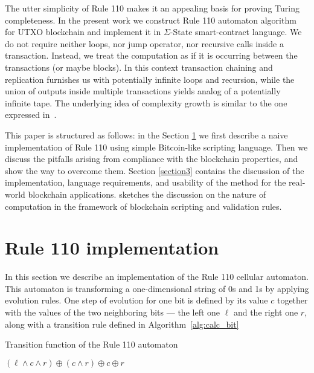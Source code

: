 \documentclass[runningheads]{llncs}
\begin{document}
    The utter simplicity of Rule 110 makes it an appealing basis for proving Turing completeness. 
    In the present work we construct Rule 110 automaton algorithm for UTXO blockchain
    and implement it in $\Sigma$-State smart-contract language\cite{chepurnoy2017sigma}.
    We do not require neither loops, nor jump
    operator, nor recursive calls inside a transaction. Instead, we treat the
    computation as if it is occurring between the transactions (or maybe
    blocks). In this context transaction chaining and replication furnishes us
    with potentially infinite loops and recursion, while the union of outputs
    inside multiple transactions yields analog of a potentially infinite tape.
    The underlying idea of complexity growth is similar to the one expressed
    in~\cite{von1951general,von1966theory}.

    This paper is structured as follows: in the Section \ref{section2} we first
    describe a naive implementation of Rule 110 using simple Bitcoin-like
    scripting language.  Then we discuss the pitfalls arising from compliance
    with the blockchain properties, and show the way to overcome them.  Section
    \ref{section3} contains the discussion of the implementation, language
    requirements, and usability of the method for the real-world blockchain
    applications.  sketches the discussion on the nature of
    computation in the framework of blockchain scripting and validation rules.

    \section{Rule 110 implementation}
    \label{section2}

    In this section we describe an implementation of the Rule 110 cellular automaton. This automaton
    is transforming a one-dimensional string of 0s and 1s by applying evolution rules. One
    step of evolution for one bit is defined by its value $c$ together with the
    values of the two neighboring bits --- the left one $\ell$ and the right one $r$, along with a 
    transition rule defined in Algorithm~\ref{alg:calc_bit}

    \begin{algorithm}[H]
        \caption{Transition function of the Rule 110 automaton}
        \label{alg:calc_bit}
        \begin{algorithmic}[1]
            \State
            \Return $(\ell\wedge c\wedge r) \oplus (c\wedge r) \oplus c \oplus r$
            \EndFunction
        \end{algorithmic}
    \end{algorithm}
\end{document}
